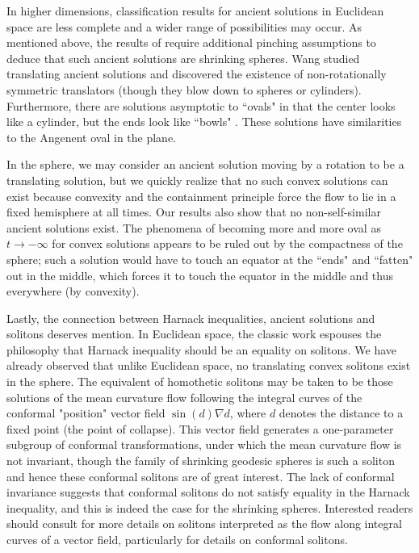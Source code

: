 \documentclass{amsart}
\theoremstyle{definition}
\theoremstyle{remark}
\numberwithin{equation}{section}
\begin{document}
In higher dimensions, classification results for ancient solutions in Euclidean space are less complete and a wider range of possibilities may occur. As mentioned above, the results of \cite{Hu-Sin 2014} require additional pinching assumptions to deduce that such ancient solutions are shrinking spheres. Wang \cite{Wang} studied translating ancient solutions and discovered the existence of non-rotationally symmetric translators (though they blow down to spheres or cylinders). Furthermore, there are solutions asymptotic to ``ovals" in that the center looks like a cylinder, but the ends look like ``bowls" \cite{Ang,Has-Her,Whi}. These solutions have similarities to the Angenent oval in the plane.

In the sphere, we may consider an ancient solution moving by a rotation to be a translating solution, but we quickly realize that no such convex solutions can exist because convexity and the containment principle force the flow to lie in a fixed hemisphere at all times. Our results also show that no non-self-similar ancient solutions exist. The phenomena of becoming more and more oval as $t\to -\infty$ for convex solutions appears to be ruled out by the compactness of the sphere; such a solution would have to touch an equator at the ``ends" and ``fatten" out in the middle, which forces it to touch the equator in the middle and thus everywhere (by convexity).

Lastly, the connection between Harnack inequalities, ancient solutions and solitons deserves mention. In Euclidean space, the classic work \cite{Hamilton 95} espouses the philosophy that Harnack inequality should be an equality on solitons. We have already observed that unlike Euclidean space, no translating convex solitons exist in the sphere. The equivalent of homothetic solitons may be taken to be those solutions of the mean curvature flow following the integral curves of the conformal "position" vector field $\sin(d)\nabla d$, where $d$ denotes the distance to a fixed point (the point of collapse). This vector field generates a one-parameter subgroup of conformal transformations, under which the mean curvature flow is not invariant, though the family of shrinking geodesic spheres is such a soliton and hence these conformal solitons are of great interest. The lack of conformal invariance suggests that conformal solitons do not satisfy equality in the Harnack inequality, and this is indeed the case for the shrinking spheres. Interested readers should consult \cite{hun-nor 12,smo 97, smo 01} for more details on solitons interpreted as the flow along integral curves of a vector field, particularly \cite{arr-sun 13} for details on conformal solitons.
\end{document}
